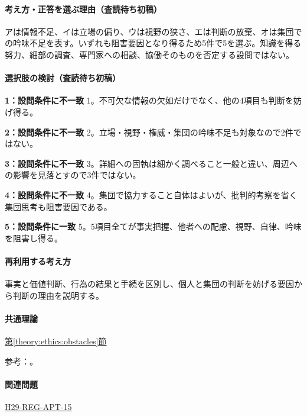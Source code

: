 \paragraph{考え方・正答を選ぶ理由（査読待ち初稿）} アは情報不足、イは立場の偏り、ウは視野の狭さ、エは判断の放棄、オは集団での吟味不足を表す。いずれも阻害要因となり得るため5件で5を選ぶ。知識を得る努力、細部の調査、専門家への相談、協働そのものを否定する設問ではない。

\paragraph{選択肢の検討（査読待ち初稿）}\mbox{}\par

\noindent\textbf{1：設問条件に不一致} 1。不可欠な情報の欠如だけでなく、他の4項目も判断を妨げ得る。\par

\noindent\textbf{2：設問条件に不一致} 2。立場・視野・権威・集団の吟味不足も対象なので2件ではない。\par

\noindent\textbf{3：設問条件に不一致} 3。詳細への固執は細かく調べること一般と違い、周辺への影響を見落とすので3件ではない。\par

\noindent\textbf{4：設問条件に不一致} 4。集団で協力すること自体はよいが、批判的考察を省く集団思考も阻害要因である。\par

\noindent\textbf{5：設問条件に一致} 5。5項目全てが事実把握、他者への配慮、視野、自律、吟味を阻害し得る。\par

\paragraph{再利用する考え方} 事実と価値判断、行為の結果と手続を区別し、個人と集団の判断を妨げる要因から判断の理由を説明する。

\paragraph{共通理論} \hyperref[theory:ethics:obstacles]{第\ref*{theory:ethics:obstacles}節}

\par 参考：\cite{davis_seven_steps}。

\paragraph{関連問題} \hyperref[q:h29-reg-apt-15]{H29-REG-APT-15}

